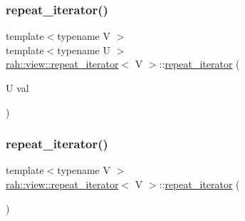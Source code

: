 \mbox{\label{structrah_1_1view_1_1repeat__iterator_af91bc578d1fe7d90373896abc8e56546}} 
\subsubsection{\texorpdfstring{repeat\_iterator()}{repeat\_iterator()}\hspace{0.1cm}{\footnotesize\ttfamily [2/4]}}
{\footnotesize\ttfamily template$<$typename V $>$ \\
template$<$typename U $>$ \\
\mbox{\hyperlink{structrah_1_1view_1_1repeat__iterator}{rah\+::view\+::repeat\+\_\+iterator}}$<$ V $>$\+::\mbox{\hyperlink{structrah_1_1view_1_1repeat__iterator}{repeat\+\_\+iterator}} (\begin{DoxyParamCaption}\item[{U}]{val }\end{DoxyParamCaption})\hspace{0.3cm}{\ttfamily [inline]}}

\mbox{\label{structrah_1_1view_1_1repeat__iterator_a627f63a3a1ecf8a5dbcc88fb47d4a494}} 
\subsubsection{\texorpdfstring{repeat\_iterator()}{repeat\_iterator()}\hspace{0.1cm}{\footnotesize\ttfamily [3/4]}}
{\footnotesize\ttfamily template$<$typename V $>$ \\
\mbox{\hyperlink{structrah_1_1view_1_1repeat__iterator}{rah\+::view\+::repeat\+\_\+iterator}}$<$ V $>$\+::\mbox{\hyperlink{structrah_1_1view_1_1repeat__iterator}{repeat\+\_\+iterator}} (\begin{DoxyParamCaption}{ }\end{DoxyParamCaption})\hspace{0.3cm}{\ttfamily [default]}}

